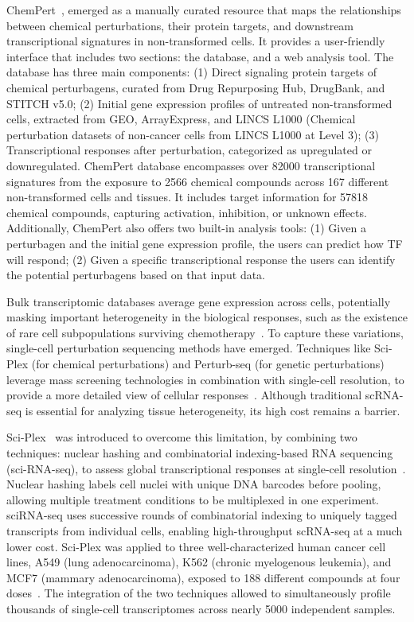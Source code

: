 ChemPert~\cite{RN86}, emerged as a manually curated resource that maps the relationships between chemical perturbations, their protein targets, and downstream transcriptional signatures in non-transformed cells. 
It provides a user-friendly interface that includes two sections: the database, and a web analysis tool. The database has three main components: 
(1) Direct signaling protein targets of chemical perturbagens, curated from Drug Repurposing Hub, DrugBank, and STITCH v5.0; 
(2) Initial gene expression profiles of untreated non-transformed cells, extracted from GEO, ArrayExpress, and LINCS L1000 (Chemical perturbation datasets of non-cancer cells from LINCS L1000 at Level 3); 
(3) Transcriptional responses after perturbation, categorized as upregulated or downregulated. 
ChemPert database encompasses over 82000 transcriptional signatures from the exposure to 2566 chemical compounds across 167 different non-transformed cells and tissues. 
It includes target information for 57818 chemical compounds, capturing activation, inhibition, or unknown effects. 
Additionally, ChemPert also offers two built-in analysis tools: 
(1) Given a perturbagen and the initial gene expression profile, the users can predict how \gls{TF} will respond; 
(2) Given a specific transcriptional response the users can identify the potential perturbagens based on that input data.


Bulk transcriptomic databases average gene expression across cells, potentially masking important heterogeneity in the biological responses, such as the existence of rare cell subpopulations surviving chemotherapy~\cite{RN88}. To capture these variations, single-cell perturbation sequencing methods have emerged. 
Techniques like Sci-Plex (for chemical perturbations) and Perturb-seq (for genetic perturbations) leverage mass screening technologies in combination with single-cell resolution, to provide a more detailed view of cellular responses~\cite{RN97}. 
Although traditional \gls{scRNA-seq} is essential for analyzing tissue heterogeneity, its high cost remains a barrier. 

Sci-Plex~\cite{RN88} was introduced to overcome this limitation, by combining two techniques: nuclear hashing and combinatorial indexing-based RNA sequencing (sci-RNA-seq), to assess global transcriptional responses at single-cell resolution~\cite{RN125, RN126}. Nuclear hashing labels cell nuclei with unique \gls{DNA} barcodes before pooling, allowing multiple treatment conditions to be multiplexed in one experiment. sciRNA-seq uses successive rounds of combinatorial indexing to uniquely tagged transcripts from individual cells, enabling high-throughput \gls{scRNA-seq} at a much lower cost. Sci-Plex was applied to three well-characterized human cancer cell lines, A549 (lung adenocarcinoma), K562 (chronic myelogenous leukemia), and MCF7 (mammary adenocarcinoma), exposed to 188 different compounds at four doses~\cite{RN88}. The integration of the two techniques allowed to simultaneously profile thousands of single-cell transcriptomes across nearly 5000 independent samples. 


